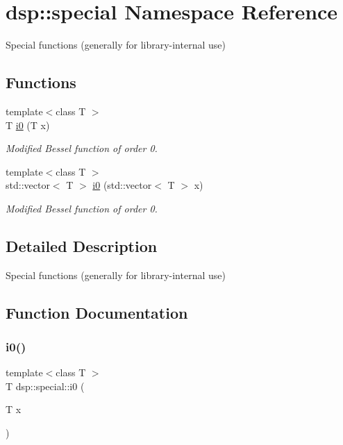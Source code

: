 \hypertarget{namespacedsp_1_1special}{}\section{dsp\+:\+:special Namespace Reference}
\label{namespacedsp_1_1special}


Special functions (generally for library-\/internal use)  


\subsection*{Functions}
\begin{DoxyCompactItemize}
\item 
{\footnotesize template$<$class T $>$ }\\T \mbox{\hyperlink{namespacedsp_1_1special_adfe84f30dea1e8d59bd4d870aa3ed704}{i0}} (T x)
\begin{DoxyCompactList}\small\item\em Modified Bessel function of order 0. \end{DoxyCompactList}\item 
{\footnotesize template$<$class T $>$ }\\std\+::vector$<$ T $>$ \mbox{\hyperlink{namespacedsp_1_1special_a4e440dd48c22a2496a51c6473a3fc09e}{i0}} (std\+::vector$<$ T $>$ x)
\begin{DoxyCompactList}\small\item\em Modified Bessel function of order 0. \end{DoxyCompactList}\end{DoxyCompactItemize}


\subsection{Detailed Description}
Special functions (generally for library-\/internal use) 

\subsection{Function Documentation}
\mbox{\label{namespacedsp_1_1special_adfe84f30dea1e8d59bd4d870aa3ed704}} 
\subsubsection{\texorpdfstring{i0()}{i0()}\hspace{0.1cm}{\footnotesize\ttfamily [1/2]}}
{\footnotesize\ttfamily template$<$class T $>$ \\
T dsp\+::special\+::i0 (\begin{DoxyParamCaption}\item[{T}]{x }\end{DoxyParamCaption})}



